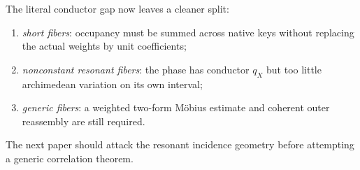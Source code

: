 The literal conductor gap now leaves a cleaner split:
\begin{enumerate}[leftmargin=2em]
\item \emph{short fibers}: occupancy must be summed across native
  keys without replacing the actual weights by unit coefficients;
\item \emph{nonconstant resonant fibers}: the phase has conductor
  \(q_X\) but too little archimedean variation on its own interval;
\item \emph{generic fibers}: a weighted two-form M\"obius estimate
  and coherent outer reassembly are still required.
\end{enumerate}
The next paper should attack the resonant incidence geometry before
attempting a generic correlation theorem.
